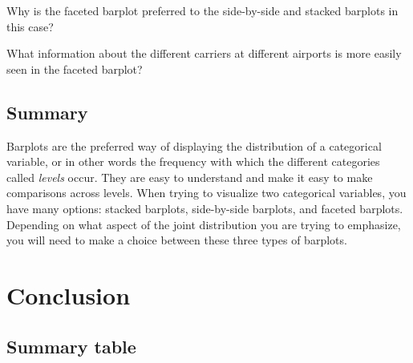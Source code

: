 \documentclass[
  letterpaper,
  DIV=11,
  numbers=noendperiod]{scrreprt}
\theoremstyle{definition}
\theoremstyle{remark}
\begin{document}
\begin{tcolorbox}[enhanced jigsaw, colback=white, toprule=.15mm, bottomrule=.15mm, titlerule=0mm, title={{🎯} Learning Check 2.36}, leftrule=.75mm, arc=.35mm, left=2mm, colframe=quarto-callout-tip-color-frame, coltitle=black, opacitybacktitle=0.6, bottomtitle=1mm, colbacktitle=quarto-callout-tip-color!10!white, opacityback=0, toptitle=1mm, rightrule=.15mm, breakable]

Why is the faceted barplot preferred to the side-by-side and stacked
barplots in this case?

\end{tcolorbox}

\begin{tcolorbox}[enhanced jigsaw, colback=white, toprule=.15mm, bottomrule=.15mm, titlerule=0mm, title={{🎯} Learning Check 2.37}, leftrule=.75mm, arc=.35mm, left=2mm, colframe=quarto-callout-tip-color-frame, coltitle=black, opacitybacktitle=0.6, bottomtitle=1mm, colbacktitle=quarto-callout-tip-color!10!white, opacityback=0, toptitle=1mm, rightrule=.15mm, breakable]

What information about the different carriers at different airports is
more easily seen in the faceted barplot?

\end{tcolorbox}

\hypertarget{summary-4}{%
\subsection{Summary}\label{summary-4}}

Barplots are the preferred way of displaying the distribution of a
categorical variable, or in other words the frequency with which the
different categories called \emph{levels} occur. They are easy to
understand and make it easy to make comparisons across levels. When
trying to visualize two categorical variables, you have many options:
stacked barplots, side-by-side barplots, and faceted barplots. Depending
on what aspect of the joint distribution you are trying to emphasize,
you will need to make a choice between these three types of barplots.

\hypertarget{sec-data-vis-conclusion}{%
\section{Conclusion}\label{sec-data-vis-conclusion}}

\hypertarget{summary-table}{%
\subsection{Summary table}\label{summary-table}}
\end{document}
